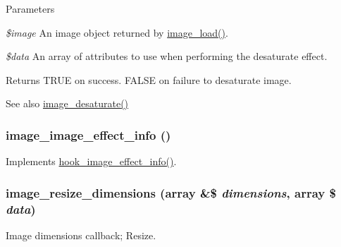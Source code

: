 \begin{DoxyParams}{Parameters}
\item[{\em \$image}]An image object returned by \hyperlink{group__image_ga96098e5b039dc3906a656fa889a04776}{image\_\-load()}. \item[{\em \$data}]An array of attributes to use when performing the desaturate effect. \end{DoxyParams}
\begin{DoxyReturn}{Returns}
TRUE on success. FALSE on failure to desaturate image. 
\end{DoxyReturn}
\begin{DoxySeeAlso}{See also}
\hyperlink{group__image_gadfcfdfcf1521b26ec790fc017c151aff}{image\_\-desaturate()} 
\end{DoxySeeAlso}
\hypertarget{image_8effects_8inc_afb803d9c3a66defed06662a85be09dd7}{
\subsubsection[{image\_\-image\_\-effect\_\-info}]{\setlength{\rightskip}{0pt plus 5cm}image\_\-image\_\-effect\_\-info ()}}
\label{image_8effects_8inc_afb803d9c3a66defed06662a85be09dd7}
Implements \hyperlink{group__hooks_ga9681816aeb01a316e98457b40a01f8ed}{hook\_\-image\_\-effect\_\-info()}. \hypertarget{image_8effects_8inc_a1bfdf4f818750949e3c1665b8dab8635}{
\subsubsection[{image\_\-resize\_\-dimensions}]{\setlength{\rightskip}{0pt plus 5cm}image\_\-resize\_\-dimensions (array \&\$ {\em dimensions}, \/  array \$ {\em data})}}
\label{image_8effects_8inc_a1bfdf4f818750949e3c1665b8dab8635}
Image dimensions callback; Resize.


